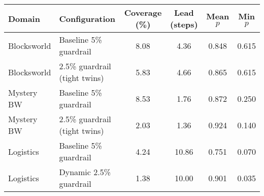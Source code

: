 \begin{tabular}{llcccc}
\toprule
Domain & Configuration & Coverage (\%) & Lead (steps) & Mean $p$ & Min $p$ \\
\midrule
Blocksworld & Baseline 5\% guardrail & 8.08 & 4.36 & 0.848 & 0.615 \\
Blocksworld & 2.5\% guardrail (tight twins) & 5.83 & 4.66 & 0.865 & 0.615 \\
Mystery BW & Baseline 5\% guardrail & 8.53 & 1.76 & 0.872 & 0.250 \\
Mystery BW & 2.5\% guardrail (tight twins) & 2.03 & 1.36 & 0.924 & 0.140 \\
Logistics & Baseline 5\% guardrail & 4.24 & 10.86 & 0.751 & 0.070 \\
Logistics & Dynamic 2.5\% guardrail & 1.38 & 10.00 & 0.901 & 0.035 \\
\bottomrule
\end{tabular}
